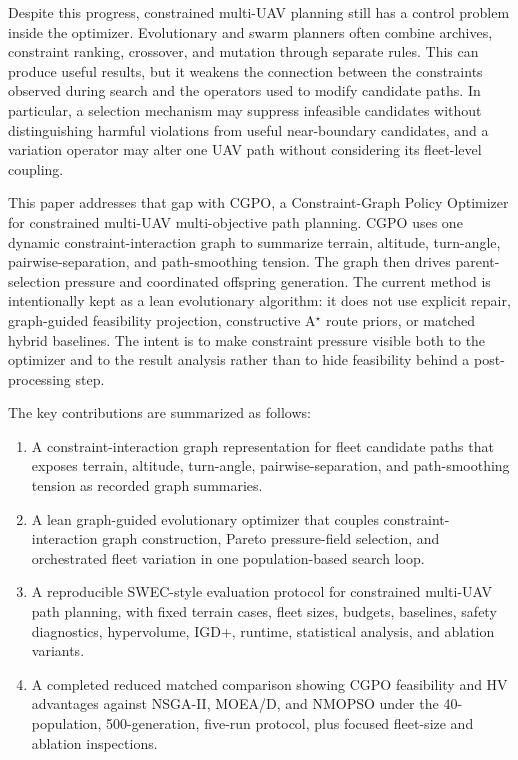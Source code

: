 \documentclass[a4paper,fleqn]{cas-dc}
\begin{document}
Despite this progress, constrained multi-UAV planning still has a control problem inside the optimizer. Evolutionary and swarm planners often combine archives, constraint ranking, crossover, and mutation through separate rules. This can produce useful results, but it weakens the connection between the constraints observed during search and the operators used to modify candidate paths. In particular, a selection mechanism may suppress infeasible candidates without distinguishing harmful violations from useful near-boundary candidates, and a variation operator may alter one UAV path without considering its fleet-level coupling.

This paper addresses that gap with CGPO, a Constraint-Graph Policy Optimizer for constrained multi-UAV multi-objective path planning. CGPO uses one dynamic constraint-interaction graph to summarize terrain, altitude, turn-angle, pairwise-separation, and path-smoothing tension. The graph then drives parent-selection pressure and coordinated offspring generation. The current method is intentionally kept as a lean evolutionary algorithm: it does not use explicit repair, graph-guided feasibility projection, constructive A$^\star$ route priors, or matched hybrid baselines. The intent is to make constraint pressure visible both to the optimizer and to the result analysis rather than to hide feasibility behind a post-processing step.

The key contributions are summarized as follows:
\begin{enumerate}
\item A constraint-interaction graph representation for fleet candidate paths that exposes terrain, altitude, turn-angle, pairwise-separation, and path-smoothing tension as recorded graph summaries.
\item A lean graph-guided evolutionary optimizer that couples constraint-interaction graph construction, Pareto pressure-field selection, and orchestrated fleet variation in one population-based search loop.
\item A reproducible SWEC-style evaluation protocol for constrained multi-UAV path planning, with fixed terrain cases, fleet sizes, budgets, baselines, safety diagnostics, hypervolume, IGD+, runtime, statistical analysis, and ablation variants.
\item A completed reduced matched comparison showing CGPO feasibility and HV advantages against NSGA-II, MOEA/D, and NMOPSO under the 40-population, 500-generation, five-run protocol, plus focused fleet-size and ablation inspections.
\end{enumerate}
\end{document}
